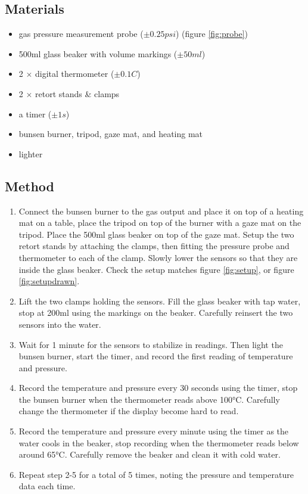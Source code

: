 \documentclass[a4paper,12pt]{article}
\begin{document}
\subsection{Materials}

\begin{itemize}
    \item gas pressure measurement probe ($\pm 0.25\si{psi}$) (figure \ref{fig:probe})
    \item 500ml glass beaker with volume markings ($\pm 50\si{ml}$)
    \item 2 $\times$ digital thermometer ($\pm 0.1\si{C}$)
    \item 2 $\times$ retort stands \& clamps
    \item a timer ($\pm 1\si{s}$)
    \item bunsen burner, tripod, gaze mat, and heating mat
    \item lighter
\end{itemize}

\subsection{Method}


\begin{enumerate}
    \item Connect the bunsen burner to the gas output and place it on top of a heating mat on a table, place the tripod on top of the burner with a gaze mat on the tripod. Place the 500ml glass beaker on top of the gaze mat. Setup the two retort stands by attaching the clamps, then fitting the pressure probe and thermometer to each of the clamp. Slowly lower the sensors so that they are inside the glass beaker. Check the setup matches figure \ref{fig:setup}, or figure \ref{fig:setupdrawn}.
    \item Lift the two clamps holding the sensors. Fill the glass beaker with tap water, stop at 200ml using the markings on the beaker. Carefully reinsert the two sensors into the water.
    \item Wait for 1 minute for the sensors to stabilize in readings. Then light the bunsen burner, start the timer, and record the first reading of temperature and pressure.
    \item Record the temperature and pressure every 30 seconds using the timer, stop the bunsen burner when the thermometer reads above 100$\si{\celsius}$. Carefully change the thermometer if the display become hard to read.
    \item Record the temperature and pressure every minute using the timer as the water cools in the beaker, stop recording when the thermometer reads below around 65$\si{\celsius}$. Carefully remove the beaker and clean it with cold water.
    \item Repeat step 2-5 for a total of 5 times, noting the pressure and temperature data each time.
\end{enumerate}
\end{document}

